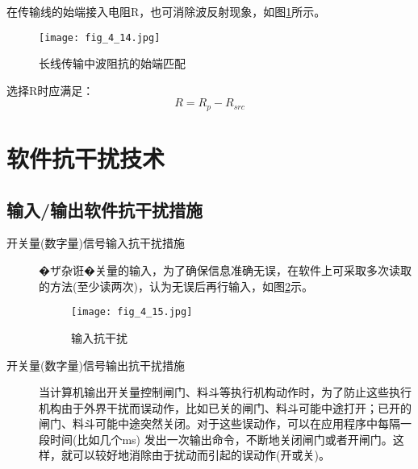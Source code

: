 \begin{description}
  在传输线的始端接入电阻R，也可消除波反射现象，如图\ref{fig_4_14}所示。
\begin{figure}[h]
  \centering
  \texttt{[image: fig\_4\_14.jpg]}\\
  \caption{长线传输中波阻抗的始端匹配}\label{fig_4_14}
\end{figure}

\begin{remark}
选择R时应满足：
\begin{equation}
  R=R_p-R_{src}
\end{equation}

\end{remark}


\end{description}


\section{软件抗干扰技术}
\subsection{输入/输出软件抗干扰措施}

\begin{description}
  \item[开关量(数字量)信号输入抗干扰措施]
�ザ杂诳�关量的输入，为了确保信息准确无误，在软件上可采取多次读取的方法(至少读两次)，认为无误后再行输入，如图\ref{fig_4_15}示。
\begin{figure}[h]
  \centering
  \texttt{[image: fig\_4\_15.jpg]}\\
  \caption{输入抗干扰}\label{fig_4_15}
\end{figure}


  \item[开关量(数字量)信号输出抗干扰措施]     当计算机输出开关量控制闸门、料斗等执行机构动作时，为了防止这些执行机构由于外界干扰而误动作，比如已关的闸门、料斗可能中途打开；已开的闸门、料斗可能中途突然关闭。对于这些误动作，可以在应用程序中每隔一段时间(比如几个ms) 发出一次输出命令，不断地关闭闸门或者开闸门。这样，就可以较好地消除由于扰动而引起的误动作(开或关)。
\end{description}


